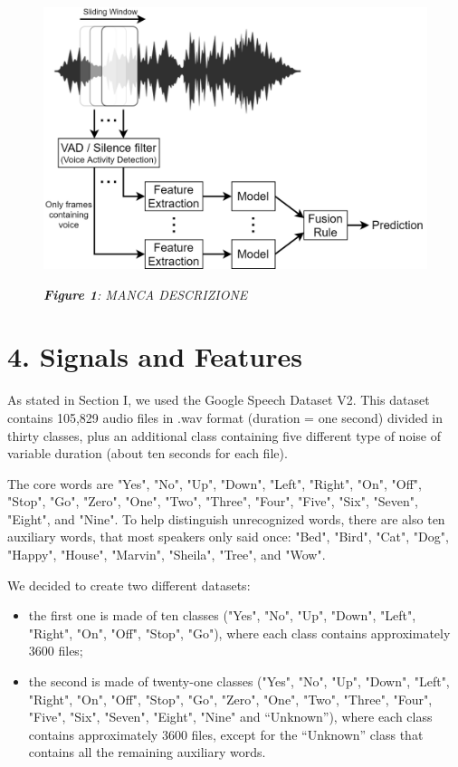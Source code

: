 \documentclass[conference]{IEEEtran}
\begin{document}
\begin{figure}
\centering
\includegraphics[scale=0.27]{End-To-End}

\begin{small}\textit{\textbf{Figure 1}: MANCA DESCRIZIONE}
\end{small}
\end{figure}

\section{4.	Signals and Features}
As stated in Section I, we used the Google Speech Dataset V2. This dataset contains 105,829 audio files in .wav format (duration =  one second) divided in thirty classes, plus an additional class containing five different type of noise of variable duration (about ten seconds for each file).

The core words are "Yes", "No", "Up", "Down", "Left", "Right", "On", "Off", "Stop", "Go", "Zero", "One", "Two", "Three", "Four", "Five", "Six", "Seven", "Eight", and "Nine". To help distinguish unrecognized words, there are also ten auxiliary words, that most speakers only said once: "Bed", "Bird", "Cat", "Dog", "Happy", "House", "Marvin", "Sheila", "Tree", and "Wow".

We decided to create two different datasets:
\begin{itemize}
\item the first one is made of ten classes ("Yes", "No", "Up", "Down", "Left", "Right", "On", "Off", "Stop", "Go"), where each class contains approximately 3600 files;
\item the second is made of twenty-one classes ("Yes", "No", "Up", "Down", "Left", "Right", "On", "Off", "Stop", "Go", "Zero", "One", "Two", "Three", "Four", "Five", "Six", "Seven", "Eight", "Nine" and “Unknown”), where each class contains approximately 3600 files, except for the “Unknown” class that contains all the remaining auxiliary words.
\end{itemize}
\end{document}
